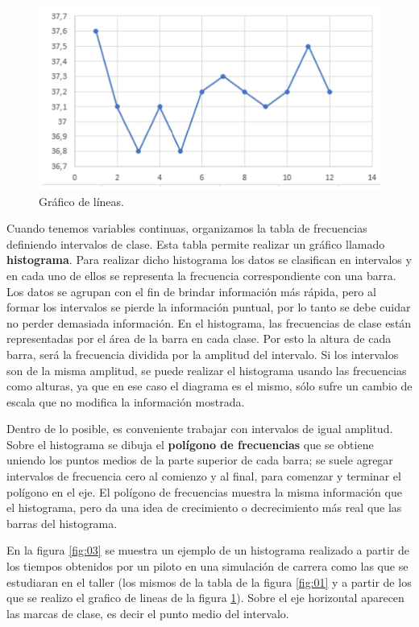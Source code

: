 \begin{figure}[h!]
	\caption{Gráfico de líneas.}
	\label{fig:02}
	\includegraphics[width=0.6\linewidth]{Trabajos/01/Anexos/02.png}
\end{figure}

Cuando tenemos variables continuas, organizamos la tabla de frecuencias definiendo intervalos de clase. Esta tabla permite realizar un gráfico llamado \textbf{histograma}. Para realizar dicho histograma los datos se clasifican en intervalos y en cada uno de ellos se representa la frecuencia correspondiente con una barra. Los datos se agrupan con el fin de brindar información más rápida, pero al formar los intervalos se pierde la información puntual, por lo tanto se debe cuidar no perder demasiada información. En el histograma, las frecuencias de clase están representadas por el área de la barra en cada clase. Por esto la altura de cada barra, será la frecuencia dividida por la amplitud del intervalo. Si los intervalos son de la misma amplitud, se puede realizar el histograma usando las frecuencias como alturas, ya que en ese caso el diagrama es el mismo, sólo sufre un cambio de escala que no modifica la información mostrada.

Dentro de lo posible, es conveniente trabajar con intervalos de igual amplitud. Sobre el histograma se dibuja el \textbf{polígono de frecuencias} que se obtiene uniendo los puntos medios de la parte superior de cada barra; se suele agregar intervalos de frecuencia cero al comienzo y al final, para comenzar y terminar el polígono en el eje. El polígono de frecuencias muestra la misma información que el histograma, pero da una idea de crecimiento o decrecimiento más real que las barras del histograma.

En la figura \ref{fig:03} se muestra un ejemplo de un histograma realizado a partir de los tiempos obtenidos por un piloto en una simulación de carrera como las que se estudiaran en el taller (los mismos de la tabla de la figura \ref{fig:01} y a partir de los que se realizo el grafico de lineas de la figura \ref{fig:02}). Sobre el eje horizontal aparecen las marcas de clase, es decir el punto medio del intervalo.

